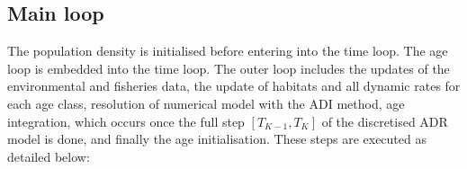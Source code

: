 \subsection{Main loop}
The population density is initialised before entering into the time loop. The age loop is embedded into the time loop. The outer loop includes the updates of the environmental and fisheries data, the update of habitats and all dynamic rates for each age class, resolution of numerical model with the ADI method, age integration, which occurs once the full step $[T_{K-1},T_K]$ of the discretised ADR model is done, and finally the age initialisation. These steps are executed as detailed below:\\
